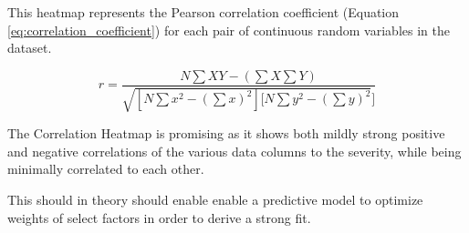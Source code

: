 \noindent
This heatmap represents the Pearson correlation coefficient (Equation \ref{eq:correlation_coefficient}) for each pair of continuous random variables in the dataset.

\begin{equation} \label{eq:correlation_coefficient}
    r = \frac{N\sum{XY}-(\sum{X}\sum{Y})}{\sqrt{ [N \sum{x^2}-(\sum{x})^2 ][N \sum{y^2}-(\sum{y})^2 }]}
\end{equation}

The Correlation Heatmap is promising as it shows both mildly strong positive and negative correlations of the various data columns to the severity, while being minimally correlated to each other. 

This should in theory should enable enable a predictive model to optimize weights of select factors in order to derive a strong fit.